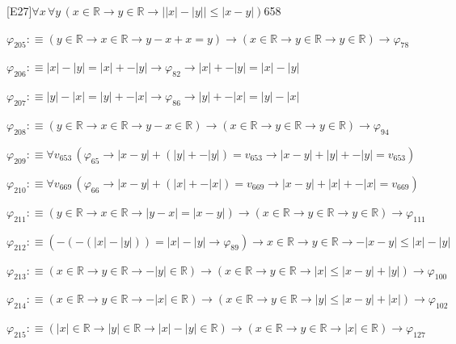 \begin{fullproof}{[E27]}{$\forall x\,\forall y\,(x \in \mathbb{R} \to y \in \mathbb{R} \to \lvert \lvert x \rvert - \lvert y \rvert \rvert \leq \lvert x - y \rvert)$}{658}
\begin{abbrevlist}
\item $\varphi_{205} :\equiv (y \in \mathbb{R} \to x \in \mathbb{R} \to y - x + x = y) \to (x \in \mathbb{R} \to y \in \mathbb{R} \to y \in \mathbb{R}) \to \varphi_{78}$
\item $\varphi_{206} :\equiv \lvert x \rvert - \lvert y \rvert = \lvert x \rvert + -\lvert y \rvert \to \varphi_{82} \to \lvert x \rvert + -\lvert y \rvert = \lvert x \rvert - \lvert y \rvert$
\item $\varphi_{207} :\equiv \lvert y \rvert - \lvert x \rvert = \lvert y \rvert + -\lvert x \rvert \to \varphi_{86} \to \lvert y \rvert + -\lvert x \rvert = \lvert y \rvert - \lvert x \rvert$
\item $\varphi_{208} :\equiv (y \in \mathbb{R} \to x \in \mathbb{R} \to y - x \in \mathbb{R}) \to (x \in \mathbb{R} \to y \in \mathbb{R} \to y \in \mathbb{R}) \to \varphi_{94}$
\item $\varphi_{209} :\equiv \forall v_{653}\,(\varphi_{65} \to \lvert x - y \rvert + (\lvert y \rvert + -\lvert y \rvert) = v_{653} \to \lvert x - y \rvert + \lvert y \rvert + -\lvert y \rvert = v_{653})$
\item $\varphi_{210} :\equiv \forall v_{669}\,(\varphi_{66} \to \lvert x - y \rvert + (\lvert x \rvert + -\lvert x \rvert) = v_{669} \to \lvert x - y \rvert + \lvert x \rvert + -\lvert x \rvert = v_{669})$
\item $\varphi_{211} :\equiv (y \in \mathbb{R} \to x \in \mathbb{R} \to \lvert y - x \rvert = \lvert x - y \rvert) \to (x \in \mathbb{R} \to y \in \mathbb{R} \to y \in \mathbb{R}) \to \varphi_{111}$
\item $\varphi_{212} :\equiv (-(-(\lvert x \rvert - \lvert y \rvert)) = \lvert x \rvert - \lvert y \rvert \to \varphi_{89}) \to x \in \mathbb{R} \to y \in \mathbb{R} \to -\lvert x - y \rvert \leq \lvert x \rvert - \lvert y \rvert$
\item $\varphi_{213} :\equiv (x \in \mathbb{R} \to y \in \mathbb{R} \to -\lvert y \rvert \in \mathbb{R}) \to (x \in \mathbb{R} \to y \in \mathbb{R} \to \lvert x \rvert \leq \lvert x - y \rvert + \lvert y \rvert) \to \varphi_{100}$
\item $\varphi_{214} :\equiv (x \in \mathbb{R} \to y \in \mathbb{R} \to -\lvert x \rvert \in \mathbb{R}) \to (x \in \mathbb{R} \to y \in \mathbb{R} \to \lvert y \rvert \leq \lvert x - y \rvert + \lvert x \rvert) \to \varphi_{102}$
\item $\varphi_{215} :\equiv (\lvert x \rvert \in \mathbb{R} \to \lvert y \rvert \in \mathbb{R} \to \lvert x \rvert - \lvert y \rvert \in \mathbb{R}) \to (x \in \mathbb{R} \to y \in \mathbb{R} \to \lvert x \rvert \in \mathbb{R}) \to \varphi_{127}$

\end{abbrevlist}
\end{fullproof}
